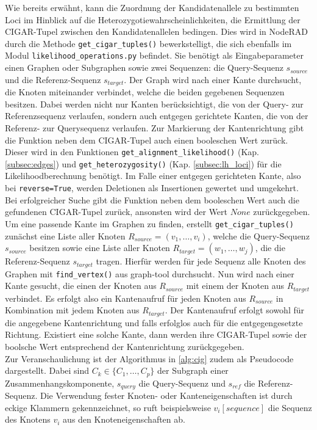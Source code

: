Wie bereits erwähnt, kann die Zuordnung der Kandidatenallele zu bestimmten Loci im Hinblick auf die Heterozygotiewahrscheinlichkeiten, die Ermittlung der CIGAR-Tupel zwischen den Kandidatenallelen bedingen. Dies wird in NodeRAD durch die Methode \lstinline|get_cigar_tuples()| bewerkstelligt, die sich ebenfalls im Modul \lstinline|likelihood_operations.py| befindet. Sie benötigt als Eingabeparameter einen Graphen oder Subgraphen sowie zwei Sequenzen: die Query-Sequenz $ s_{source} $ und die Referenz-Sequenz $ s_{target} $. Der Graph wird nach einer Kante durchsucht, die Knoten miteinander verbindet, welche die beiden gegebenen Sequenzen besitzen. Dabei werden nicht nur Kanten berücksichtigt, die von der Query- zur Referenzsequenz verlaufen, sondern auch entgegen gerichtete Kanten, die von der Referenz- zur Querysequenz verlaufen. Zur Markierung der Kantenrichtung gibt die Funktion neben dem CIGAR-Tupel auch einen booleschen Wert zurück. Dieser wird in den Funktionen \lstinline|get_alignment_likelihood()| (Kap. \ref{subsec:edges}) und \lstinline|get_heterozygosity()| (Kap. \ref{subsec:lh_loci}) für die Likelihoodberechnung benötigt. Im Falle einer entgegen gerichteten Kante, also bei \lstinline|reverse=True|, werden Deletionen als Insertionen gewertet und umgekehrt. Bei erfolgreicher Suche gibt die Funktion neben dem booleschen Wert auch die gefundenen CIGAR-Tupel zurück, ansonsten wird der Wert $ None $ zurückgegeben.\\

Um eine passende Kante im Graphen zu finden, erstellt \lstinline|get_cigar_tuples()| zunächst eine Liste aller Knoten $ R_{source} = (v_{1}, \dots, v_{i})$, welche die Query-Sequenz $ s_{source} $ besitzen sowie eine Liste aller Knoten $ R_{target} = (w_{1}, \dots, w_{j}) $, die die Referenz-Sequenz $ s_{target} $ tragen. Hierfür werden für jede Sequenz alle Knoten des Graphen mit \lstinline|find_vertex()| aus graph-tool durchsucht. Nun wird nach einer Kante gesucht, die einen der Knoten aus $ R_{source} $ mit einem der Knoten aus $ R_{target} $ verbindet. Es erfolgt also ein Kantenaufruf für jeden Knoten aus $ R_{source} $ in Kombination mit jedem  Knoten aus $ R_{target} $. Der Kantenaufruf erfolgt sowohl für die angegebene Kantenrichtung und falls erfolglos auch für die entgegengesetzte Richtung. Existiert eine solche Kante, dann werden ihre CIGAR-Tupel sowie der boolsche Wert entsprechend der Kantenrichtung zurückgegeben. \\

Zur Veranschaulichung ist der Algorithmus in \ref{alg:cig} zudem als Pseudocode dargestellt. Dabei sind $ C_{k} \in \{C_{1}, \dots ,C_{p}\} $ der Subgraph einer Zusammenhangskomponente, $ s_{query} $ die Query-Sequenz und $ s_{ref} $ die Referenz-Sequenz. Die Verwendung fester Knoten- oder Kanteneigenschaften ist durch eckige Klammern gekennzeichnet, so ruft beispielsweise $v_{i}[sequence]$ die Sequenz des Knotens $v_{i}$ aus den Knoteneigenschaften ab. \\


